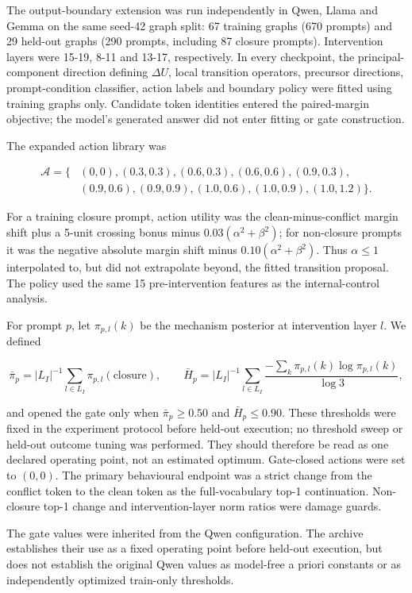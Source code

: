 \documentclass[12pt]{article}
\begin{document}
The output-boundary extension was run independently in Qwen, Llama and Gemma on the same seed-42 graph split: 67 training graphs (670 prompts) and 29 held-out graphs (290 prompts, including 87 closure prompts). Intervention layers were 15-19, 8-11 and 13-17, respectively. In every checkpoint, the principal-component direction defining \(\Delta U\), local transition operators, precursor directions, prompt-condition classifier, action labels and boundary policy were fitted using training graphs only. Candidate token identities entered the paired-margin objective; the model's generated answer did not enter fitting or gate construction.

The expanded action library was

\[
\begin{aligned}
\mathcal A=\{&(0,0),(0.3,0.3),(0.6,0.3),(0.6,0.6),(0.9,0.3),\\
&(0.9,0.6),(0.9,0.9),(1.0,0.6),(1.0,0.9),(1.0,1.2)\}.
\end{aligned}
\]

For a training closure prompt, action utility was the clean-minus-conflict margin shift plus a 5-unit crossing bonus minus \(0.03(\alpha^2+\beta^2)\); for non-closure prompts it was the negative absolute margin shift minus \(0.10(\alpha^2+\beta^2)\). Thus \(\alpha\leq1\) interpolated to, but did not extrapolate beyond, the fitted transition proposal. The policy used the same 15 pre-intervention features as the internal-control analysis.

For prompt \(p\), let \(\pi_{p,l}(k)\) be the mechanism posterior at intervention layer \(l\). We defined

\[
\bar\pi_p=|L_I|^{-1}\sum_{l\in L_I}\pi_{p,l}(\mathrm{closure}),\qquad
\bar H_p=|L_I|^{-1}\sum_{l\in L_I}\frac{-\sum_k\pi_{p,l}(k)\log\pi_{p,l}(k)}{\log 3},
\]

and opened the gate only when \(\bar\pi_p\geq0.50\) and \(\bar H_p\leq0.90\). These thresholds were fixed in the experiment protocol before held-out execution; no threshold sweep or held-out outcome tuning was performed. They should therefore be read as one declared operating point, not an estimated optimum. Gate-closed actions were set to \((0,0)\). The primary behavioural endpoint was a strict change from the conflict token to the clean token as the full-vocabulary top-1 continuation. Non-closure top-1 change and intervention-layer norm ratios were damage guards.

The gate values were inherited from the Qwen configuration. The archive establishes their use as a fixed operating point before held-out execution, but does not establish the original Qwen values as model-free a priori constants or as independently optimized train-only thresholds.
\end{document}
